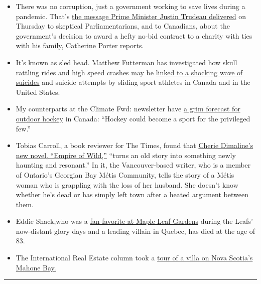 \begin{itemize}
\item
  There was no corruption, just a government working to save lives
  during a pandemic. That's
  \href{https://www.nytimes.com/2020/07/30/world/canada/justin-trudeau-we-charity.html}{the
  message Prime Minister Justin Trudeau delivered} on Thursday to
  skeptical Parliamentarians, and to Canadians, about the government's
  decision to award a hefty no-bid contract to a charity with ties with
  his family, Catherine Porter reports.
\item
  It's known as sled head. Matthew Futterman has investigated how skull
  rattling rides and high speed crashes may be
  \href{https://www.nytimes.com/2020/07/26/sports/olympics/olympics-bobsled-suicide-brain-injuries.html}{linked
  to a shocking wave of suicides} and suicide attempts by sliding sport
  athletes in Canada and in the United States.
\item
  My counterparts at the Climate Fwd: newsletter have
  \href{https://www.nytimes.com/2020/07/29/climate/skating-hockey-climate-change.html}{a
  grim forecast for outdoor hockey} in Canada: ``Hockey could become a
  sport for the privileged few.''
\item
  Tobias Carroll, a book reviewer for The Times, found that
  \href{https://www.nytimes.com/2020/07/28/books/review/empire-of-wild-cherie-dimaline.html}{Cherie
  Dimaline's new novel, ``Empire of Wild,''} ``turns an old story into
  something newly haunting and resonant.'' In it, the Vancouver-based
  writer, who is a member of Ontario's Georgian Bay Métis Community,
  tells the story of a Métis woman who is grappling with the loss of her
  husband. She doesn't know whether he's dead or has simply left town
  after a heated argument between them.
\item
  Eddie Shack,who was a
  \href{https://www.nytimes.com/2020/07/27/sports/hockey/eddie-shack-feisty-wing-for-powerful-maple-leafs-dies-at-83.html}{fan
  favorite at Maple Leaf Gardens} during the Leafs' now-distant glory
  days and a leading villain in Quebec, has died at the age of 83.
\item
  The International Real Estate column took a
  \href{https://www.nytimes.com/2020/07/29/realestate/house-hunting-in-nova-scotia-a-sprawling-seaside-villa-for-2-million.html}{tour
  of a villa on Nova Scotia's Mahone Bay.}
\end{itemize}

\begin{center}\rule{0.5\linewidth}{\linethickness}\end{center}

